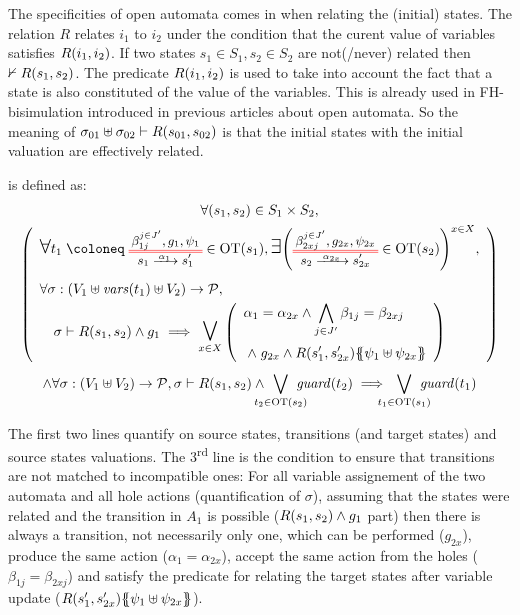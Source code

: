 \documentclass{article}
\begin{document}
The specificities of open automata comes in when relating the (initial) states.
The relation \(R\) relates \(i_1\) to \(i_2\) under the condition that the curent value of variables satisfies \(R{\left(i_1, i_2\right)}\).
If two states \(s_1 \in S_1, s_2 \in S_2\) are not(/never) related then \(\nvdash R{\left(s_1, s_2\right)}\).
The predicate \(R{\left(i_1, i_2\right)}\) is used to take into account the fact that a state is also constituted of the value of the variables.
This is already used in FH-bisimulation introduced in previous articles about open automata.
So the meaning of \(\sigma_{01} \uplus \sigma_{02} \vdash R{\left(s_{01}, s_{02}\right)}\) is that the initial states with the initial valuation are effectively related.
\begin{defi}
 is defined as: %
\begin{multline*}
	\forall \mpar{s_1, s_2} \in S_1 \times S_2, \\
	\mpar{\everymath{\displaystyle}\begin{array}{l}
		\bigsymb{\forall} t_1 \defobject \OTx{1}{}{1}{} \in \fOT{s_1}, \bigsymb{\exists} \mpar{\OTx{2}{x}{2x}{} \in \fOT{s_2}}^{x \in X}, \\[12pt]
		\forall \sigma: \mpar{V_1 \uplus \fvars{t_1} \uplus V_2} \to \values, \\
		\quad \sigma \vdash R\mpar{s_1, s_2} \wedge g_1 \implies \operatorname*{\bigsymb{\bigvee}}_{x \in X} \mpar{\begin{array}{l}
			\alpha_1 = \alpha_{2x} \wedge \bigwedge_{j \in J'} \beta_{1j} = \beta_{2xj} \\[12pt]
			\nwedge g_{2x} \wedge R\mpar{s'_1, s'_{2x}}\psubst{\psi_1 \uplus \psi_{2x}}
		\end{array}} \\[12pt]
	\end{array}} \\
	\wedge \forall \sigma: \mpar{V_1 \uplus V_2} \to \values, \sigma \vdash R\mpar{s_1, s_2} \wedge \bigvee_\subbox{t_2 \in \fOT{s_2}} \fguard{t_2} \implies \bigvee_\subbox{t_1 \in \fOT{s_1}} \fguard{t_1}
\end{multline*}
\end{defi}
The first two lines quantify on source states, transitions (and target states) and source states valuations.
The 3\textsuperscript{rd} line is the condition to ensure that transitions are not matched to incompatible ones:
For all variable assignement of the two automata and all hole actions (quantification of \(\sigma\)), assuming that the states were related and the transition in \(A_1\) is possible (\(R{\left(s_1, s_2\right)} \wedge g_1\) part) then there is always a transition, not necessarily only one, which can be performed (\(g_{2x}\)), produce the same action (\(\alpha_1 = \alpha_{2x}\)), accept the same action from the holes (\(\beta_{1j} = \beta_{2xj}\)) and satisfy the predicate for relating the target states after variable update (\(R{\left(s'_1, s'_{2x}\right)}{\left\{\!\!{\left\{\psi_1 \uplus \psi_{2x}\right\}}\!\!\right\}}\)).
\end{document}
